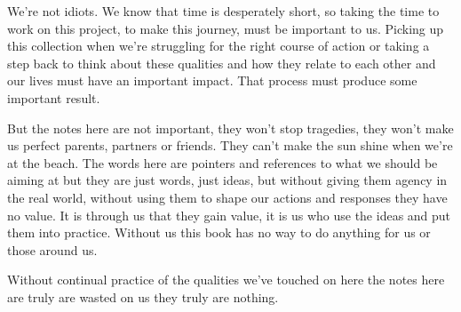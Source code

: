 \cleardoublepage
{ \small

We’re not idiots. We know that time is desperately short, so taking the time to work on this project, to make this journey, must be important to us. Picking up this collection when we’re struggling for the right course of action or taking a step back to think about these qualities and how they relate to each other and our lives must have an important impact. That process must produce some important result. 

But the notes here are not important, they won't stop tragedies, they won't make us perfect parents, partners or friends. They can't make the sun shine when we're at the beach. The words here are pointers and references to what we should be aiming at but they are just words, just ideas, but without giving them agency in the real world, without using them to shape our actions and responses they have no value. It is through us that they gain value, it is us who use the ideas and put them into practice. Without us this book has no way to do anything for us or those around us. 

Without continual practice of the qualities we've touched on here the notes here are truly are wasted on us they truly are nothing. 





}